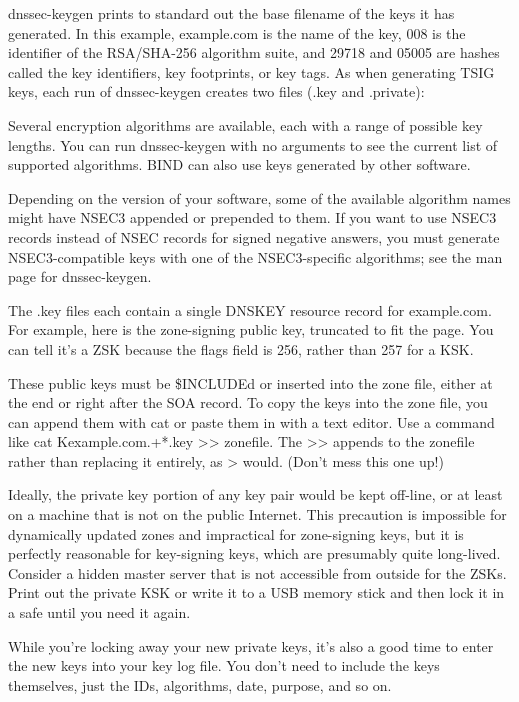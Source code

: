 {dnssec-keygen} prints to standard out the base filename of the keys it
has generated. In this example, {example.com} is the name of the key,
{008} is the identifier of the RSA/SHA-256 algorithm suite, and {29718}
and {05005} are hashes called the key identifiers, key footprints, or
key tags. As when generating TSIG keys, each run of {dnssec-keygen}
creates two files ({.key} and {.private}):


Several{ }encryption{ }algorithms{ }are{ }available, each with a range
of possible key lengths. You can run {dnssec-keygen} with no arguments
to see the current list of supported algorithms. BIND can also use keys
generated by other software.

Depending on the version of your software, some of the available
algorithm names might have NSEC3 appended or prepended to them. If you
want to use NSEC3 records instead of NSEC records for signed negative
answers, you must generate NSEC3-compatible keys with one of the
NSEC3-specific algorithms; see the man page for {dnssec-keygen}.

The {.key} files each contain a single DNSKEY resource record for
example.com. For example, here is the zone-signing public key, truncated
to fit the page. You can tell it's a ZSK because the flags field is 256,
rather than 257 for a KSK.


These public keys must be {\$INCLUDE}d or inserted into the zone file,
either at the end or right after the SOA record. To copy the keys into
the zone file, you can append them with {cat }or paste them in with a
text editor. Use a command like {cat Kexample.com.+*.key
\textgreater\textgreater{} zonefile}. The {\textgreater\textgreater{}}
appends to the {zonefile} rather than replacing it entirely, as
{\textgreater{}} would. (Don't mess this one up!)

Ideally, the private key portion of any key pair would be kept off-line,
or at least on a machine that is not on the public Internet. This
precaution is impossible for dynamically updated zones and impractical
for zone-signing keys, but it is perfectly reasonable for key-signing
keys, which are presumably quite long-lived. Consider a hidden master
server that is not accessible from outside for the ZSKs. Print out the
private KSK or write it to a USB memory stick and then lock it in a safe
until you need it again.

While you're locking away your new private keys, it's also a good time
to enter the new keys into your key log file. You don't need to include
the keys themselves, just the IDs, algorithms, date, purpose, and so on.

